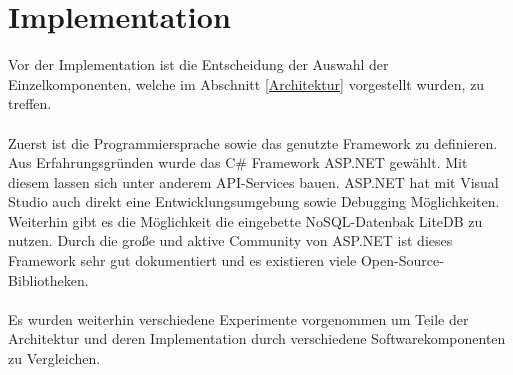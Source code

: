 \section{Implementation} \label{sec:Implementation}
Vor der Implementation ist die Entscheidung der Auswahl der Einzelkomponenten, welche im Abschnitt \ref{Architektur} vorgestellt wurden, zu treffen.
\\ \\
Zuerst ist die Programmiersprache sowie das genutzte Framework zu definieren.
Aus Erfahrungsgründen wurde das C\# Framework ASP.NET gewählt.
Mit diesem lassen sich unter anderem API-Services bauen.
ASP.NET hat mit Visual Studio auch direkt eine Entwicklungsumgebung sowie Debugging Möglichkeiten.
Weiterhin gibt es die Möglichkeit die eingebette NoSQL-Datenbak LiteDB zu nutzen.
Durch die große und aktive Community von ASP.NET ist dieses Framework sehr gut dokumentiert und es existieren viele Open-Source-Bibliotheken.
\\ \\
Es wurden weiterhin verschiedene Experimente vorgenommen um Teile der Architektur und deren Implementation durch verschiedene Softwarekomponenten zu Vergleichen.
